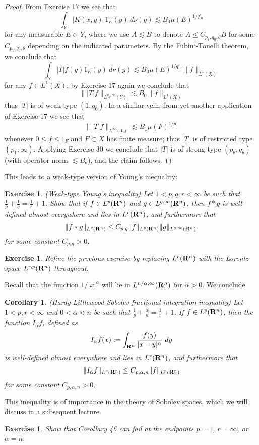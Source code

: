 \documentclass[10pt,reqno]{amsart}
\newtheorem{corollary}[theorem]{Corollary}
\newtheorem{exercise}[theorem]{Exercise}
\begin{document}
\begin{proof}
From Exercise 17 we see that
%
\[ \int_Y |K(x,y)| 1_E(y)\ d\nu(y) \lesssim B_0 \mu(E)^{1/q'_0}\]
%
for any measurable $E \subset Y$, where we use $A \lesssim B$ to denote $A \leq C_{p_1,q_0,\theta} B$ for some $C_{p_1,q_0,\theta}$ depending on the indicated parameters. By the Fubini-Tonelli theorem, we conclude that
%
\[ \int_Y |T| f(y) 1_E(y)\ d\nu(y) \lesssim B_0 \mu(E)^{1/q'_0} \|f\|_{L^1(X)}\]
%
for any $f \in L^1(X)$; by Exercise 17 again we conclude that
%
\[ \| |T| f \|_{L^{q_0,\infty}(Y)} \lesssim B_0 \|f\|_{L^1(X)}\]
%
thus $|T|$ is of weak-type $(1,q_0)$. In a similar vein, from yet another application of Exercise 17 we see that
%
\[ \| |T| f \|_{L^{\infty}(Y)} \lesssim B_1 \mu(F)^{1/p_1}\]
%
whenever $0 \leq f \leq 1_F$ and $F \subset X$ has finite measure; thus $|T|$ is of restricted type $(p_1,\infty)$. Applying Exercise 30 we conclude that $|T|$ is of strong type $(p_\theta,q_\theta)$ (with operator norm $\lesssim B_\theta$), and the claim follows.
\end{proof}

This leads to a weak-type version of Young’s inequality:

\begin{exercise}
    (Weak-type Young’s inequality) Let $1 < p,q,r < \infty$ be such that $\frac{1}{p} + \frac{1}{q} = \frac{1}{r} + 1$. Show that if $f \in L^p({\bf R}^n)$ and $g \in L^{q,\infty}({\bf R}^n)$, then $f*g$ is well-defined almost everywhere and lies in $L^r({\bf R}^n)$, and furthermore that
\[     \|f*g\|_{L^r({\bf R}^n)} \leq C_{p,q} \|f\|_{L^p({\bf R}^n)} \|g\|_{L^{q,\infty}({\bf R}^n)}.\]
    for some constant $C_{p,q} > 0$. 
\end{exercise}

\begin{exercise}
    Refine the previous exercise by replacing $L^r({\bf R}^n)$ with the Lorentz space $L^{r,p}({\bf R}^n)$ throughout. 
\end{exercise}

Recall that the function $1/|x|^\alpha$ will lie in $L^{n/\alpha,\infty}({\bf R}^n)$ for $\alpha > 0$. We conclude

\begin{corollary}
    (Hardy-Littlewood-Sobolev fractional integration inequality) Let $1 < p, r < \infty$ and $0 < \alpha < n$ be such that $\frac{1}{p} + \frac{\alpha}{n} = \frac{1}{r} + 1$. If $f \in L^p({\bf R}^n)$, then the function $I_\alpha f$, defined as
\[     I_\alpha f(x) := \int_{{\bf R}^n} \frac{f(y)}{|x-y|^\alpha}\ dy\]
    is well-defined almost everywhere and lies in $L^r({\bf R}^n)$, and furthermore that
\[     \| I_\alpha f \|_{L^r({\bf R}^n)} \leq C_{p,\alpha,n} \|f\|_{L^p({\bf R}^n)}\]
    for some constant $C_{p,\alpha,n} > 0$. 
\end{corollary}

This inequality is of importance in the theory of Sobolev spaces, which we will discuss in a subsequent lecture.

\begin{exercise}
    Show that Corollary 46 can fail at the endpoints $p=1$, $r=\infty$, or $\alpha=n$. 
\end{exercise}
\end{document}
